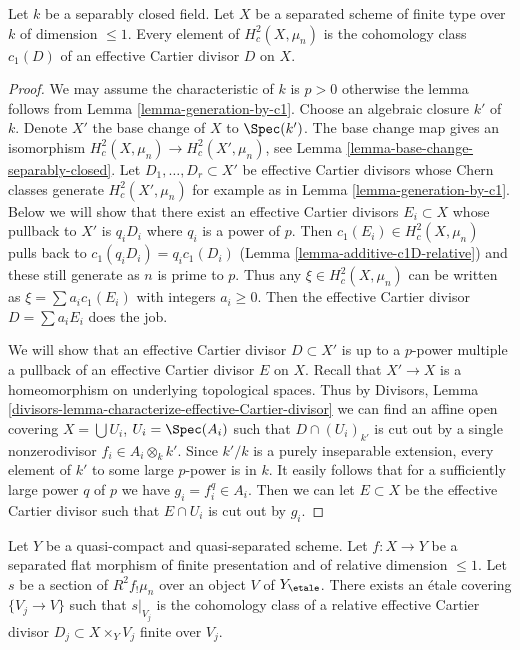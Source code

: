 \begin{lemma}
\label{lemma-generation-by-c1-nonperfect}
Let $k$ be a separably closed field. Let $X$ be a separated
scheme of finite type over $k$ of dimension $\leq 1$.
Every element of $H^2_c(X, \mu_n)$ is the cohomology class $c_1(D)$
of an effective Cartier divisor $D$ on $X$.
\end{lemma}

\begin{proof}
We may assume the characteristic of $k$ is $p > 0$ otherwise
the lemma follows from Lemma \ref{lemma-generation-by-c1}.
Choose an algebraic closure $k'$ of $k$. Denote $X'$ the base
change of $X$ to $\Spec(k')$. The base change map gives an isomorphism
$H^2_c(X, \mu_n) \to H^2_c(X', \mu_n)$, see
Lemma \ref{lemma-base-change-separably-closed}.
Let $D_1, \ldots, D_r \subset X'$ be effective Cartier divisors
whose Chern classes generate $H^2_c(X', \mu_n)$ for example
as in Lemma \ref{lemma-generation-by-c1}.
Below we will show that there exist an effective Cartier divisors
$E_i \subset X$ whose pullback to $X'$ is $q_iD_i$
where $q_i$ is a power of $p$. Then $c_1(E_i) \in H^2_c(X, \mu_n)$
pulls back to $c_1(q_iD_i) = q_ic_1(D_i)$
(Lemma \ref{lemma-additive-c1D-relative})
and these still generate as $n$ is prime to $p$.
Thus any $\xi \in H^2_c(X, \mu_n)$ can be written as $\xi = \sum a_ic_1(E_i)$
with integers $a_i \geq 0$. Then the effective Cartier divisor
$D = \sum a_iE_i$ does the job.

\medskip\noindent
We will show that an effective Cartier divisor $D \subset X'$
is up to a $p$-power multiple a pullback of an effective Cartier
divisor $E$ on $X$. Recall that $X' \to X$ is a homeomorphism on
underlying topological spaces. Thus by
Divisors, Lemma \ref{divisors-lemma-characterize-effective-Cartier-divisor}
we can find an affine open covering $X = \bigcup U_i$,
$U_i = \Spec(A_i)$ such that $D \cap (U_i)_{k'}$
is cut out by a single nonzerodivisor $f_i \in A_i \otimes_k k'$.
Since $k'/k$ is a purely inseparable extension, every element
of $k'$ to some large $p$-power is in $k$. It easily follows
that for a sufficiently large power $q$ of $p$ we have
$g_i = f_i^q \in A_i$. Then we can let $E \subset X$ be the
effective Cartier divisor such that $E \cap U_i$ is cut
out by $g_i$.
\end{proof}

\begin{lemma}
\label{lemma-relative-generation}
Let $Y$ be a quasi-compact and quasi-separated scheme. Let $f : X \to Y$
be a separated flat morphism of finite presentation and
of relative dimension $\leq 1$. Let $s$ be a section of $R^2f_!\mu_n$
over an object $V$ of $Y_\etale$. There exists an \'etale covering
$\{V_j \to V\}$ such that $s|_{V_j}$ is the cohomology class of
a relative effective Cartier divisor $D_j \subset X \times_Y V_j$
finite over $V_j$.
\end{lemma}

